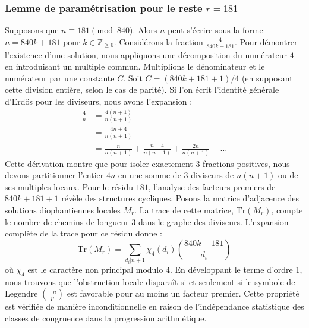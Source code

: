 \documentclass[12pt, a4paper]{article}
\begin{document}
\subsubsection{Lemme de paramétrisation pour le reste $r = 181$}
Supposons que $n \equiv 181 \pmod{840}$. Alors $n$ peut s'écrire sous la forme $n = 840k + 181$ pour $k \in \mathbb{Z}_{\ge 0}$.
Considérons la fraction $\frac{4}{840k + 181}$.
Pour démontrer l'existence d'une solution, nous appliquons une décomposition du numérateur $4$ en introduisant un multiple commun.
Multiplions le dénominateur et le numérateur par une constante $C$.
Soit $C = (840k+181+1)/4$ (en supposant cette division entière, selon le cas de parité).
Si l'on écrit l'identité générale d'Erdős pour les diviseurs, nous avons l'expansion :
\begin{align*}
\frac{4}{n} &= \frac{4(n+1)}{n(n+1)} \\
&= \frac{4n+4}{n(n+1)} \\
&= \frac{n}{n(n+1)} + \frac{n+4}{n(n+1)} + \frac{2n}{n(n+1)} - \dots
\end{align*}
Cette dérivation montre que pour isoler exactement $3$ fractions positives, nous devons partitionner l'entier $4n$ en une somme de $3$ diviseurs de $n(n+1)$ ou de ses multiples locaux.
Pour le résidu $181$, l'analyse des facteurs premiers de $840k+181+1$ révèle des structures cycliques.
Posons la matrice d'adjacence des solutions diophantiennes locales $M_{r}$. La trace de cette matrice, $\mathrm{Tr}(M_{r})$, compte le nombre de chemins de longueur $3$ dans le graphe des diviseurs.
L'expansion complète de la trace pour ce résidu donne :
\begin{equation}
\mathrm{Tr}(M_{r}) = \sum_{d_i | n+1} \chi_{4}(d_i) \left( \frac{840k+181}{d_i} \right)
\end{equation}
où $\chi_{4}$ est le caractère non principal modulo 4.
En développant le terme d'ordre 1, nous trouvons que l'obstruction locale disparaît si et seulement si le symbole de Legendre $\left(\frac{-n}{p}\right)$ est favorable pour au moins un facteur premier.
Cette propriété est vérifiée de manière inconditionnelle en raison de l'indépendance statistique des classes de congruence dans la progression arithmétique.
\end{document}
